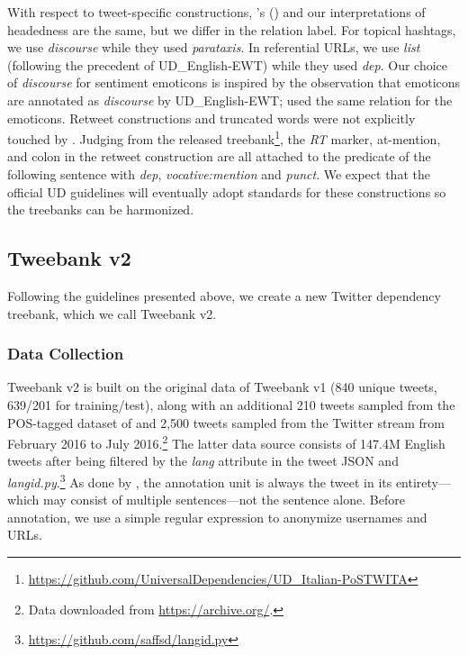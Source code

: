 \documentclass[11pt,a4paper]{article}
\newcommand{\citeposs}[2][]{\citeauthor{#2}'s (\citeyear[#1]{#2})}
\begin{document}
With respect to tweet-specific constructions,
\citeposs{sanguinetti-17} and our  interpretations of headedness are the same, 
but we differ in the relation label.
For topical hashtags, we use \textit{discourse} while they used \textit{parataxis}. 
In referential URLs, we use \textit{list} (following the precedent of UD\_English-EWT) while they used \textit{dep}.
Our choice of \textit{discourse} for sentiment emoticons
is inspired by the observation that emoticons are annotated as \textit{discourse} by UD\_English-EWT;
\citet{sanguinetti-17} used the same relation for the emoticons.
Retweet constructions and truncated words were not explicitly touched
by \citet{sanguinetti-17}.
Judging from the released treebank\footnote{\url{https://github.com/UniversalDependencies/UD_Italian-PoSTWITA}}, the \textit{RT} marker, at-mention, and colon in the retweet construction are all attached to the predicate of the following sentence with \textit{dep}, \textit{vocative:mention} and \textit{punct}.
We expect that the official UD guidelines will eventually adopt standards for these constructions so the treebanks can be harmonized.





























\subsection{\sc Tweebank v2}\label{sec:anno-process}
Following the guidelines presented above, we create a new Twitter
dependency treebank, which we call {\sc Tweebank v2}.

\subsubsection{Data Collection}
{\sc Tweebank v2} is built on the original data of {\sc Tweebank v1}
(840 unique tweets, 639/201 for training/test), along with an 
additional 210 tweets sampled from the POS-tagged dataset of
 and 2,500 tweets sampled
from the Twitter stream from February 2016 to July 2016.\footnote{Data downloaded from \url{https://archive.org/}.}
The latter data source consists of 147.4M English tweets after being
filtered by the {\it lang} attribute in the tweet JSON and {\it
  langid.py}.\footnote{\url{https://github.com/saffsd/langid.py}}
As done by \citet{kong-EtAl:2014:EMNLP2014}, the
annotation unit is always the tweet in its entirety---which may consist of multiple sentences---not the sentence alone. Before annotation, we use a simple regular expression to anonymize usernames and URLs.
\end{document}
